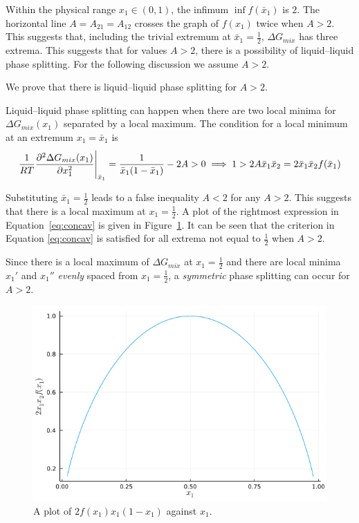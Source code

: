 Within the physical range $x_1 \in (0,1)$, the infimum $\inf{f(\bar x_1)}$ is 
$2$.  The horizontal line $A = A_{21} = A_{12}$ crosses the graph of $f(x_1)$ 
twice when $A > 2$. This suggests that, including the trivial extremum at 
$\bar x_1=\frac12$, $\Delta G_{mix}$ has three extrema.
This suggests that for values $A>2$, there is a possibility of liquid--liquid 
phase splitting. For the following discussion we assume $A > 2$.

We prove that there is liquid--liquid phase splitting for $A > 2$.

Liquid--liquid phase splitting can happen when there are two local minima for
$\Delta G_{mix}(x_1)$ separated by a local maximum. The condition for a 
local minimum at an extremum $x_1 = \bar x_1$ is
\begin{equation}\label{eq:concav}
    \frac1{RT}
    \pdv[2]{\Delta G_{mix}(x_1)}{x_1}\Bigg\rvert_{\bar x_1} = 
    \dfrac{1}{\bar x_1(1-\bar x_1)} - 2A > 0 
    \implies 1 > 2A\bar x_1\bar x_2 = 2\bar x_1\bar x_2f(\bar x_1)
\end{equation}

Substituting $\bar x_1 = \frac12$ leads to a false inequality $A < 2$ 
for any $A>2$.
This suggests that there is a local maximum at $x_1 = \frac12$. A plot of the
rightmost expression in Equation~\ref{eq:concav} is given in 
Figure~\ref{fig:product}. It can be seen that the criterion in Equation
\ref{eq:concav} is satisfied for all extrema not equal to $\frac12$ when $A>2$.

Since there is a local maximum of $\Delta G_{mix}$ at $x_1=\frac12$ and there
are local minima $x_1'$ and $x_1''$ \textit{evenly} spaced from $x_1=\frac12$,
a \textit{symmetric} phase splitting can occur for $A>2$.

\begin{figure}[ht]
    \centering
    \includegraphics[scale=0.5]{./figs/fx2.png}
    \caption{A plot of $2f(x_1)x_1(1-x_1)$ against $x_1$.}
    \label{fig:product}
\end{figure}

